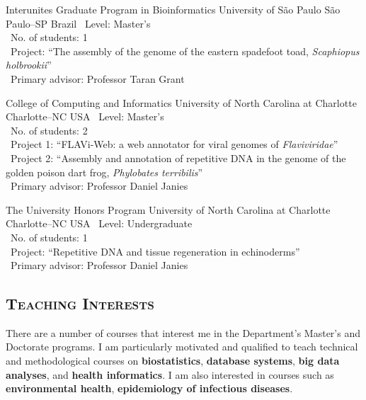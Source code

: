 \documentclass[11pt, letterpaper, sans]{moderncv}
\begin{document}
{Interunites Graduate Program in Bioinformatics}
{University of São Paulo}
{São Paulo--SP}
{Brazil}
{
	\textbullet~Level: Master's\\
	\textbullet~No. of students: 1\\
	\textbullet~Project: ``The assembly of the genome of the eastern spadefoot toad, \emph{Scaphiopus holbrookii}''\\
	\textbullet~Primary advisor: Professor Taran Grant\\
}

\cventry{---}
{College of Computing and Informatics}
{University of North Carolina at Charlotte}
{Charlotte--NC}
{USA}
{
	\textbullet~Level: Master's\\
	\textbullet~No. of students: 2\\
	\textbullet~Project 1: ``FLAVi-Web: a web annotator for viral genomes of \emph{Flaviviridae}''\\
	\textbullet~Project 2: ``Assembly and annotation of repetitive DNA in the genome of the golden poison dart frog, \emph{Phylobates terribilis}''\\
	\textbullet~Primary advisor: Professor Daniel Janies\\
}

\cventry{---}
{The University Honors Program}
{University of North Carolina at Charlotte}
{Charlotte--NC}
{USA}
{
	\textbullet~Level: Undergraduate\\
	\textbullet~No. of students: 1\\
	\textbullet~Project: ``Repetitive DNA and tissue regeneration in echinoderms''\\
	\textbullet~Primary advisor: Professor Daniel Janies\\
}

\vspace{.5em}
	\subsection{\textsc{Teaching Interests}}
\vspace{.5em}

There are a number of courses that interest me in the Department's Master's and Doctorate programs. I am particularly motivated and qualified to teach technical and methodological courses on \textbf{biostatistics}, \textbf{database systems}, \textbf{big data analyses}, and \textbf{health informatics}. I am also interested in courses such as \textbf{environmental health}, \textbf{epidemiology of infectious diseases}.
\end{document}
